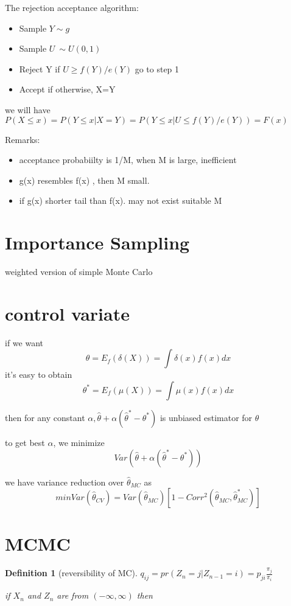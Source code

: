 \documentclass[10pt]{article}
\theoremstyle{break}
\newtheorem{defn}{Definition}[subsection]
\begin{document}
The rejection acceptance algorithm:
\begin{itemize}
    \item Sample $Y\sim g$
    \item Sample $U~\sim U(0,1)$
    \item Reject Y if $U\geq f(Y)/e(Y)$ go to step 1
    \item Accept if otherwise, X=Y
\end{itemize}

we will have 
$P(X\leq x)=P(Y\leq x|X=Y)=P(Y\leq x|U\leq f(Y)/e(Y))=F(x)$

Remarks:
\begin{itemize}
    \item acceptance probabiilty is 1/M, when M is large, inefficient 
    \item g(x) resembles f(x) , then M small.
    \item if g(x) shorter tail than f(x). may not exist suitable M 
\end{itemize}

\section{Importance Sampling}
    weighted version of simple Monte Carlo 

\section{control variate}
    if we want 
    $$\theta =E_f(\delta(X))=\int \delta(x)f(x)dx$$
    it's easy to obtain
    $$\theta^* =E_f(\mu(X))=\int \mu(x)f(x)dx$$

    then for any constant $\alpha, \hat\theta+\alpha(\hat\theta^*-\theta^*)$ is unbiased 
    estimator for $\theta$

    to get best $\alpha$, we minimize $$Var(\hat\theta+\alpha(\hat\theta^*-\theta^*))$$

    we have variance reduction over $\hat\theta_{MC}$ as 
    $$min Var(\hat\theta_{CV})= Var(\hat\theta_{MC})[1-Corr^2(\hat\theta_{MC},
    \hat\theta^*_{MC})]$$

\section{MCMC}
    \begin{defn}[reversibility of MC]
        $q_{ij}=pr(Z_n=j|Z_{n-1}=i) = p_{ji}\frac{\pi_j}{\pi_i}$

        if $X_n$ and $Z_n$ are from $(-\infty, \infty)$ then 
    \end{defn}
\end{document}
